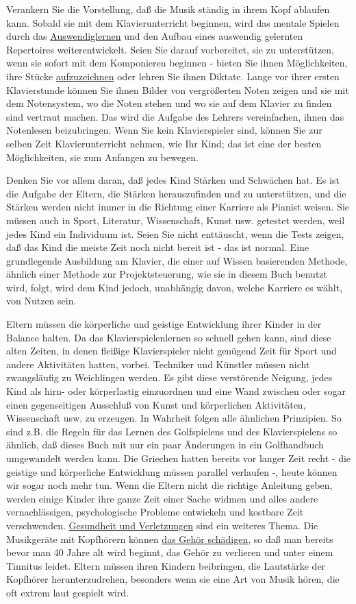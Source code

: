 Verankern Sie die Vorstellung, daß die Musik ständig in ihrem Kopf ablaufen kann.
Sobald sie mit dem Klavierunterricht beginnen, wird das mentale Spielen durch das \hyperlink{c1iii6}{Auswendiglernen} und den Aufbau eines auswendig gelernten Repertoires weiterentwickelt.
Seien Sie darauf vorbereitet, sie zu unterstützen, wenn sie sofort mit dem Komponieren beginnen - bieten Sie ihnen Möglichkeiten, ihre Stücke \hyperlink{c1iii13}{aufzuzeichnen} oder lehren Sie ihnen Diktate.
Lange vor ihrer ersten Klavierstunde können Sie ihnen Bilder von vergrößerten Noten zeigen und sie mit dem Notensystem, wo die Noten stehen und wo sie auf dem Klavier zu finden sind vertraut machen.
Das wird die Aufgabe des Lehrers vereinfachen, ihnen das Notenlesen beizubringen.
Wenn Sie kein Klavierspieler sind, können Sie zur selben Zeit Klavierunterricht nehmen, wie Ihr Kind; das ist eine der besten Möglichkeiten, sie zum Anfangen zu bewegen.

Denken Sie vor allem daran, daß jedes Kind Stärken und Schwächen hat.
Es ist die Aufgabe der Eltern, die Stärken herauszufinden und zu unterstützen, und die Stärken werden nicht immer in die Richtung einer Karriere als Pianist weisen.
Sie müssen auch in Sport, Literatur, Wissenschaft, Kunst usw. getestet werden, weil jedes Kind ein Individuum ist.
Seien Sie nicht enttäuscht, wenn die Tests zeigen, daß das Kind die meiste Zeit noch nicht bereit ist - das ist normal.
Eine grundlegende Ausbildung am Klavier, die einer auf Wissen basierenden Methode, ähnlich einer Methode zur Projektsteuerung, wie sie in diesem Buch benutzt wird, folgt, wird dem Kind jedoch, unabhängig davon, welche Karriere es wählt, von Nutzen sein.

Eltern müssen die körperliche und geistige Entwicklung ihrer Kinder in der Balance halten.
Da das Klavierspielenlernen so schnell gehen kann, sind diese alten Zeiten, in denen fleißige Klavierspieler nicht genügend Zeit für Sport und andere Aktivitäten hatten, vorbei.
Techniker und Künstler müssen nicht zwangsläufig zu Weichlingen werden.
Es gibt diese verstörende Neigung, jedes Kind als hirn- oder körperlastig einzuordnen und eine Wand zwischen oder sogar einen gegenseitigen Ausschluß von Kunst und körperlichen Aktivitäten, Wissenschaft usw. zu erzeugen.
In Wahrheit folgen alle ähnlichen Prinzipien.
So sind z.B. die Regeln für das Lernen des Golfspielens und des Klavierspielens so ähnlich, daß dieses Buch mit nur ein paar Änderungen in ein Golfhandbuch umgewandelt werden kann.
Die Griechen hatten bereits vor langer Zeit recht - die geistige und körperliche Entwicklung müssen parallel verlaufen -, heute können wir sogar noch mehr tun.
Wenn die Eltern nicht die richtige Anleitung geben, werden einige Kinder ihre ganze Zeit einer Sache widmen und alles andere vernachlässigen, psychologische Probleme entwickeln und kostbare Zeit verschwenden.
\hyperlink{c1iii10krank}{Gesundheit und Verletzungen} sind ein weiteres Thema.
Die Musikgeräte mit Kopfhörern können \hyperlink{c1iii10gehoer}{das Gehör schädigen}, so daß man bereits bevor man 40 Jahre alt wird beginnt, das Gehör zu verlieren und unter einem Tinnitus leidet.
Eltern müssen ihren Kindern beibringen, die Lautstärke der Kopfhörer herunterzudrehen, besonders wenn sie eine Art von Musik hören, die oft extrem laut gespielt wird.
 

